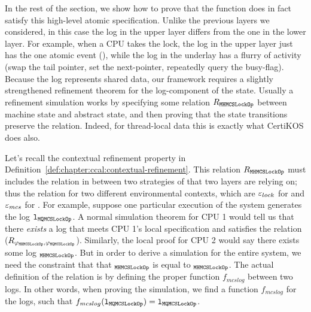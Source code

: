 In the rest of the section, we show how to prove that the function
does in fact satisfy this high-level atomic specification.
Unlike the previous layers we considered, in this case the log in the
upper layer differs from the one in the lower layer. For example, when
a CPU takes the lock, the log in the upper layer just has the one
atomic event (), while the log in the underlay
has a flurry of activity (swap the tail pointer, set the next-pointer,
repeatedly query the busy-flag).
Because the log represents shared data, our framework requires a
slightly strengthened refinement theorem for the log-component of the
state. Usually a refinement simulation works by specifying some
relation $R_{{\mathrm{\texttt{MHMCSLockOp}}}}$ between machine state and abstract state, and then
proving that the state transitions preserve the relation. Indeed, for
thread-local data this is exactly what CertiKOS does also.

Let's recall the contextual refinement property in Definition~\ref{def:chapter:ccal:contextual-refinement}. 
This relation  $R_{{\mathrm{\texttt{MHMCSLockOp}}}}$ must includes the relation in between 
two strategies of that two layers are relying on; 
thus the relation for two different environmental contexts, which are ${\varepsilon}_{lock}$ for  and ${\varepsilon}_{mcs}$ for .
For example, suppose one particular
execution of the system generates the log ${\mathrm{\texttt{l}}}_{{\mathrm{\texttt{MQMCSLockOp}}}}$.  A normal simulation
theorem for CPU 1 would tell us that there \emph{exists} a log 
that meets CPU 1's local specification and satisfies the relation
($R_{\varphi_{{\mathrm{\texttt{MHMCSLockOp}}}}, \varphi_{{\mathrm{\texttt{MQMCSLockOp}}}}}$). 
Similarly, the local proof for CPU 2 would say there
exists some log $_{{\mathrm{\texttt{MHMCSLockOp}}}}$. But in order to derive a simulation for the
entire system, we need the constraint that that $_{{\mathrm{\texttt{MHMCSLockOp}}}}$  is equal to
$_{{\mathrm{\texttt{MHMCSLockOp}}}}$. The actual definition of the relation is by defining the proper function $f_{mcslog}$ between two logs.
In other words, when proving the simulation,
we find a function $f_{mcslog}$ for the logs, such that $f_{mcslog}({\mathrm{\texttt{l}}}_{{\mathrm{\texttt{MQMCSLockOp}}}}) = {\mathrm{\texttt{l}}}_{{\mathrm{\texttt{MQMCSLockOp}}}}$.


